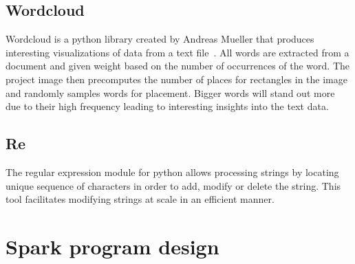\subsection{Wordcloud}

Wordcloud is a python library created by Andreas Mueller that produces
interesting visualizations of data from a text
file~\cite{www-amueller}.  All words are extracted from a document and
given weight based on the number of occurrences of the word.  The
project image then precomputes the number of places for rectangles in
the image and randomly samples words for placement.  Bigger words will
stand out more due to their high frequency leading to interesting
insights into the text data.

\subsection{Re}

The regular expression module for python allows processing strings by
locating unique sequence of characters in order to add, modify or
delete the string.  This tool facilitates modifying strings at scale
in an efficient manner.

\section{Spark program design}

